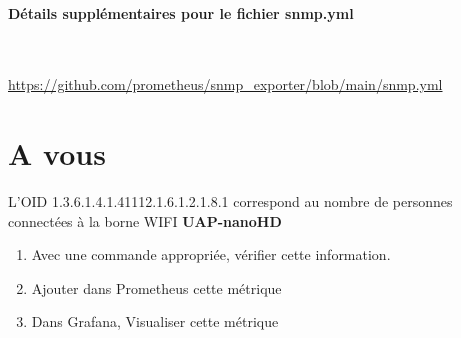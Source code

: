\documentclass[french, 12pt]{article}%
\newif\ifPROF
\begin{document}
 
\paragraph{Détails supplémentaires pour le fichier snmp.yml} \  

\href{https://github.com/prometheus/snmp_exporter/blob/main/snmp.yml}{https://github.com/prometheus/snmp\_exporter/blob/main/snmp.yml}


\section{A vous}
L'OID 1.3.6.1.4.1.41112.1.6.1.2.1.8.1 correspond au nombre de personnes connectées à la borne WIFI \textbf{UAP-nanoHD}

\begin{enumerate}
\item Avec une commande appropriée, vérifier cette information. 
\item Ajouter dans Prometheus cette métrique
\item Dans Grafana, Visualiser cette métrique
\end{enumerate}

\ifPROF
\color{red}
\begin{lstlisting}[style=commande] 
#snmpwalk -v2c -c public 192.168.1.73 1.3.6.1.4.1.41112.1.6.1.2.1.8.1
snmpwalk -v2c -c public 192.168.1.31 1.3.6.1.4.1.41112.1.6.1.2.1.8.2
\end{lstlisting}
\normalcolor
\fi
\end{document}
